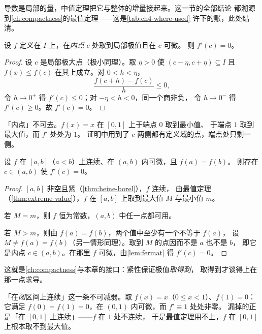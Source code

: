 导数是局部的量，中值定理把它与整体的增量接起来。这一节的全部结论
都溯源到\cref{ch:compactness}的最值定理——这是\cref{tab:ch4-where-used}
许下的账，此处结清。

\begin{lemma}[Fermat]
  \label{lem:fermat}
  设 \(f\) 定义在 \(I\) 上，在\emph{内点} \(c\) 处取到局部极值且在 \(c\) 可微。
  则 \(f'(c)=0\)。
\end{lemma}

\begin{proof}
  设 \(c\) 是局部极大点（极小同理）。取 \(\eta>0\) 使 \((c-\eta,c+\eta) \subseteq I\)
  且 \(f(x) \le f(c)\) 在其上成立。对 \(0<h<\eta\)，
  \[
    \frac{f(c+h)-f(c)}{h} \le 0 ,
  \]
  令 \(h \to 0^{+}\) 得 \(f'(c) \le 0\)；对 \(-\eta<h<0\)，同一个商非负，
  令 \(h \to 0^{-}\) 得 \(f'(c) \ge 0\)。故 \(f'(c)=0\)。
\end{proof}

\begin{pitfall}
  「内点」不可去。\(f(x)=x\) 在 \([0,1]\) 上于端点 \(0\) 取到最小值、
  于端点 \(1\) 取到最大值，而 \(f'\) 处处为 \(1\)。
  证明中用到了 \(c\) 两侧都有定义域的点，端点处只剩一侧。
\end{pitfall}

\begin{theorem}[Rolle]
  \label{thm:rolle}
  设 \(f\) 在 \([a,b]\)（\(a<b\)）上连续、在 \((a,b)\) 内可微，且 \(f(a)=f(b)\)。
  则存在 \(c \in (a,b)\) 使 \(f'(c)=0\)。
\end{theorem}

\begin{proof}
  \([a,b]\) 非空且紧（\cref{thm:heine-borel}），\(f\) 连续，
  由最值定理（\cref{thm:extreme-value}），\(f\) 在 \([a,b]\) 上取到最大值 \(M\) 与最小值 \(m\)。

  若 \(M=m\)，则 \(f\) 恒为常数，\((a,b)\) 中任一点都可用。

  若 \(M>m\)，则由 \(f(a)=f(b)\)，两个值中至少有一个不等于 \(f(a)\)，
  设 \(M \neq f(a)=f(b)\)（另一情形同理）。取到 \(M\) 的点因而不是 \(a\) 也不是 \(b\)，
  即它是内点 \(c \in (a,b)\)。在那里 \(f\) 可微，由\cref{lem:fermat} 得 \(f'(c)=0\)。
\end{proof}

\begin{remark}
  这就是\cref{ch:compactness}与本章的接口：紧性保证极值\emph{取得到}，
  取得到才谈得上在那一点求导。

  「在\emph{闭}区间上连续」这一条不可减弱。取 \(f(x)=x\)（\(0 \le x<1\)）、\(f(1)=0\)：
  它满足 \(f(0)=f(1)=0\)，在 \((0,1)\) 内可微，而 \(f' \equiv 1\) 处处非零。
  漏掉的正是「在 \([0,1]\) 上连续」——\(f\) 在 \(1\) 处不连续，
  于是最值定理用不上，\(f\) 在 \([0,1]\) 上根本取不到最大值。
\end{remark}

